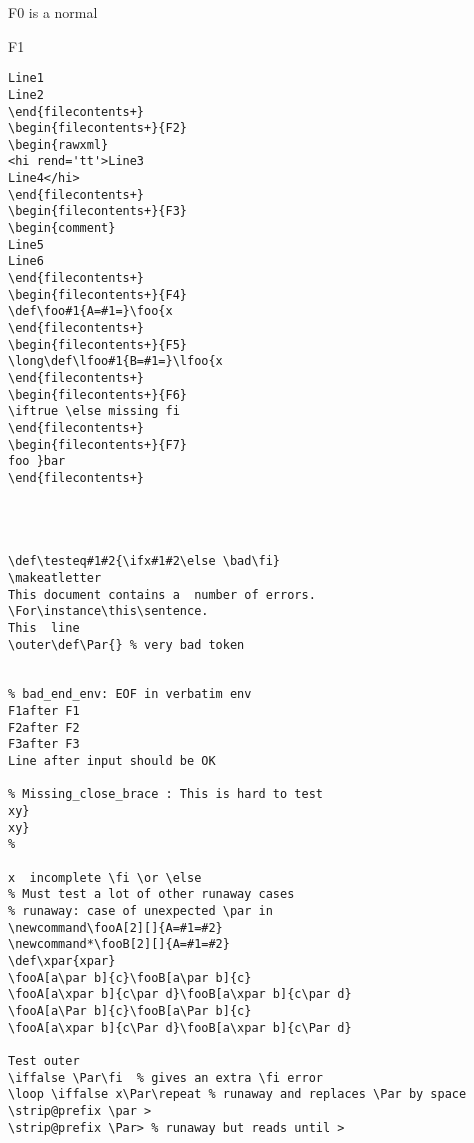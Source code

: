 \documentclass{article}
\begin{document}
\begin{filecontents+}{F0}
is a normal
\end{filecontents+}

\begin{filecontents+}{F1}
\begin{Verbatim}
Line1
Line2
\end{filecontents+}
\begin{filecontents+}{F2}
\begin{rawxml}
<hi rend='tt'>Line3 
Line4</hi>
\end{filecontents+}
\begin{filecontents+}{F3}
\begin{comment}
Line5
Line6
\end{filecontents+}
\begin{filecontents+}{F4}
\def\foo#1{A=#1=}\foo{x
\end{filecontents+}
\begin{filecontents+}{F5}
\long\def\lfoo#1{B=#1=}\lfoo{x
\end{filecontents+}
\begin{filecontents+}{F6}
\iftrue \else missing fi
\end{filecontents+}
\begin{filecontents+}{F7}
foo }bar
\end{filecontents+}




\def\testeq#1#2{\ifx#1#2\else \bad\fi}
\makeatletter
This document contains a  number of errors.
\For\instance\this\sentence.
This  line
\outer\def\Par{} % very bad token


% bad_end_env: EOF in verbatim env 
F1after F1
F2after F2
F3after F3
Line after input should be OK

% Missing_close_brace : This is hard to test
xy}
xy}
% 

x  incomplete \fi \or \else 
% Must test a lot of other runaway cases
% runaway: case of unexpected \par in 
\newcommand\fooA[2][]{A=#1=#2}
\newcommand*\fooB[2][]{A=#1=#2}
\def\xpar{xpar}
\fooA[a\par b]{c}\fooB[a\par b]{c}
\fooA[a\xpar b]{c\par d}\fooB[a\xpar b]{c\par d}
\fooA[a\Par b]{c}\fooB[a\Par b]{c}
\fooA[a\xpar b]{c\Par d}\fooB[a\xpar b]{c\Par d}

Test outer 
\iffalse \Par\fi  % gives an extra \fi error
\loop \iffalse x\Par\repeat % runaway and replaces \Par by space
\strip@prefix \par >
\strip@prefix \Par> % runaway but reads until >


\end{Verbatim}
\end{filecontents+}
\end{document}
